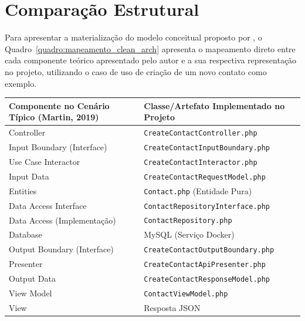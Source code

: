 \section{Comparação Estrutural}
        \par Para apresentar a materialização do modelo conceitual proposto por \cite{livro:martin:cleanarch}, o Quadro~\ref{quadro:mapeamento_clean_arch} apresenta o mapeamento direto entre cada componente teórico apresentado pelo autor e a sua respectiva representação no projeto, utilizando o caso de uso de criação de um novo contato como exemplo.
        
        \begin{quadro}[H]
            \caption{Mapeamento dos Componentes}
            \label{quadro:mapeamento_clean_arch}
            
            \begin{tabularx}{\linewidth}{|l|X|} %
                \toprule
                {\small \textbf{Componente no Cenário Típico (Martin, 2019)}} & {\small \textbf{Classe/Artefato Implementado no Projeto}} \\
                \midrule
                Controller                  & \texttt{CreateContactController.php} \\
                Input Boundary (Interface)  & \texttt{CreateContactInputBoundary.php} \\
                Use Case Interactor         & \texttt{CreateContactInteractor.php} \\
                Input Data                  & \texttt{CreateContactRequestModel.php} \\
                Entities                    & \texttt{Contact.php} (Entidade Pura) \\
                Data Access Interface       & \texttt{ContactRepositoryInterface.php} \\
                Data Access (Implementação) & \texttt{ContactRepository.php} \\
                Database                    & MySQL (Serviço Docker) \\
                Output Boundary (Interface) & \texttt{CreateContactOutputBoundary.php} \\
                Presenter                   & \texttt{CreateContactApiPresenter.php} \\
                Output Data                 & \texttt{CreateContactResponseModel.php} \\
                View Model                  & \texttt{ContactViewModel.php} \\
                View                        & Resposta JSON \\
                \bottomrule
            \end{tabularx}
            
        \end{quadro}
       
